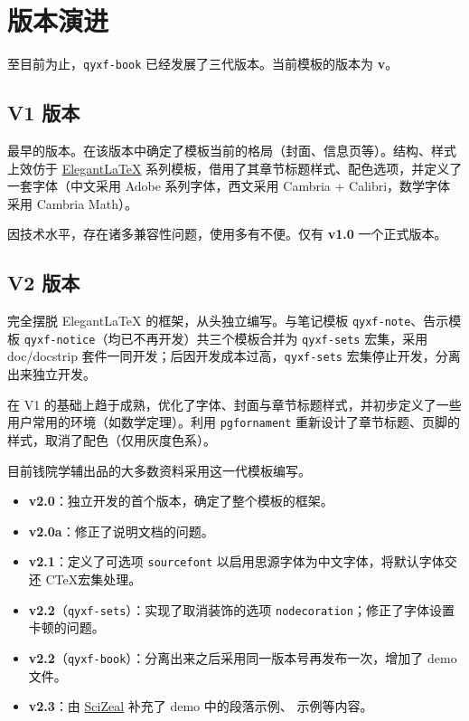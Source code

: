 \documentclass[
  10pt,
  twoside,
  openany,
  b5paper, %
  colorscheme = basic %
]{qyxf-book}
\begin{document}
\section{版本演进}

至目前为止，\verb|qyxf-book| 已经发展了三代版本。当前模板的版本为 \textbf{v\styversion}。

\subsection{V1 版本}
最早的版本。在该版本中确定了模板当前的格局（封面、信息页等）。结构、样式上效仿于 \href{https://elegantlatex.org/}{Elegant\LaTeX} 系列模板，借用了其章节标题样式、配色选项，并定义了一套字体（中文采用 Adobe 系列字体，西文采用 Cambria + Calibri，数学字体采用 Cambria Math）。

因技术水平，存在诸多兼容性问题，使用多有不便。仅有 \textbf{v1.0} 一个正式版本。

\subsection{V2 版本}

完全摆脱 Elegant\LaTeX{} 的框架，从头独立编写。与笔记模板 \verb|qyxf-note|、告示模板 \verb|qyxf-notice|（均已不再开发）共三个模板合并为 \verb|qyxf-sets| 宏集，采用 doc/docstrip 套件一同开发；后因开发成本过高，\verb|qyxf-sets| 宏集停止开发，分离出来独立开发。

在 V1 的基础上趋于成熟，优化了字体、封面与章节标题样式，并初步定义了一些用户常用的环境（如数学定理）。利用 \verb|pgfornament| 重新设计了章节标题、页脚的样式，取消了配色（仅用灰度色系）。

目前钱院学辅出品的大多数资料采用这一代模板编写。

\begin{itemize}
  \item \textbf{v2.0}：独立开发的首个版本，确定了整个模板的框架。
  \item \textbf{v2.0a}：修正了说明文档的问题。
  \item \textbf{v2.1}：定义了可选项 \verb|sourcefont| 以启用思源字体为中文字体，将默认字体交还 C\TeX 宏集处理。
  \item \textbf{v2.2}（\verb|qyxf-sets|）：实现了取消装饰的选项 \verb|nodecoration|；修正了字体设置卡顿的问题。
  \item \textbf{v2.2}（\verb|qyxf-book|）：分离出来之后采用同一版本号再发布一次，增加了 demo 文件。
  \item \textbf{v2.3}：由 \href{https://github.com/SciZeal}{SciZeal} 补充了 demo 中的段落示例、 示例等内容。
\end{itemize}
\end{document}
